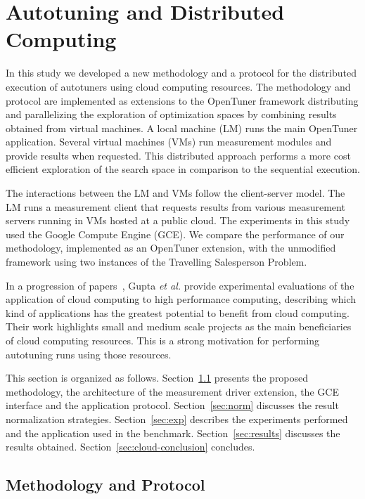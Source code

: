 \section{Autotuning and Distributed Computing}
\label{sec:autotuningCloud}

In this study we developed a new methodology and a protocol for the
distributed execution of autotuners using cloud computing resources.  The
methodology and protocol are implemented as extensions to the OpenTuner
framework distributing and parallelizing the exploration of optimization spaces
by combining results obtained from virtual machines.  A local machine (LM) runs
the main OpenTuner application. Several virtual machines (VMs) run measurement
modules and provide results when requested. This distributed approach performs
a more cost efficient exploration of the search space in comparison to the
sequential execution.

The interactions between the LM and VMs follow the
client-server model. The LM runs a measurement client that requests
results from various measurement servers running in VMs hosted at
a public cloud. The experiments in this study used the Google Compute Engine
(GCE).  We compare the performance of our methodology, implemented as an
OpenTuner extension, with the unmodified framework using two instances of the
Travelling Salesperson Problem.

In a progression of
papers~\cite{gupta2012exploring,gupta2014evaluating,gupta2013the}, Gupta
\emph{et al.} provide experimental evaluations of the application of cloud
computing to high performance computing, describing which kind of applications
has the greatest potential to benefit from cloud computing.  Their work
highlights small and medium scale projects as the main beneficiaries of cloud
computing resources. This is a strong motivation for performing autotuning
runs using those resources.

This section is organized as follows.
Section~\ref{sec:ext} presents the proposed methodology, the architecture of
the measurement driver extension, the GCE interface and the application
protocol.
Section~\ref{sec:norm} discusses the result normalization strategies.
Section~\ref{sec:exp} describes the experiments performed and the
application used in the benchmark.
Section~\ref{sec:results} discusses the results obtained.
Section~\ref{sec:cloud-conclusion} concludes.

\subsection{Methodology and Protocol}
\label{sec:ext}

